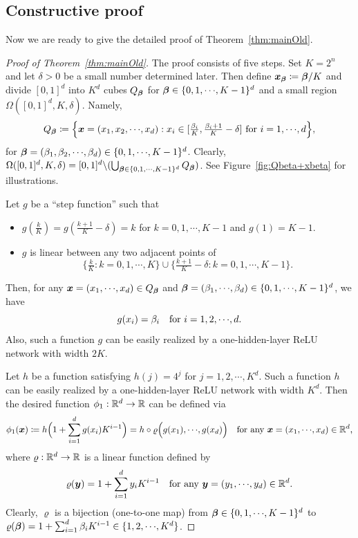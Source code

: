\documentclass[nohyperref]{article}
\theoremstyle{plain}
\theoremstyle{definition}
\theoremstyle{remark}
\begin{document}
\subsection{Constructive proof}\label{sec:proof:main:old}
Now we are ready to give the detailed proof of Theorem~\ref{thm:mainOld}.
\begin{proof}[Proof of Theorem~\ref{thm:mainOld}]
	The proof consists of five steps.
	Set $K=2^n $  and let $\delta>0$ be a small number determined later. Then define ${\bm{x}}_{\bm{\beta}}\coloneqq {\bm{\beta}}/K$ and divide $[0,1]^d$ into $K^d$  cubes $Q_{\bm{\beta}}$ for $\bmbeta\in\{0,1,\cdots,K-1\}^d$ and a small region $\Omega([0,1]^d,K,\delta)$. Namely,
	\begin{equation*}
		Q_\bmbeta\coloneqq \Big\{\bmx=(x_1,x_2,\cdots,x_d): x_i\in [\tfrac{\beta_i}{K},\tfrac{\beta_i+1}{K}-\delta]\ \tn{for}\ i=1,\cdots,d\Big\},
	\end{equation*}
	for $\bmbeta=(\beta_1,\beta_2,\cdots,\beta_d)\in \{0,1,\cdots,K-1\}^d$. 
	Clearly, $\Omega([0,1]^d,K,\delta)= [0,1]^d\backslash (\bigcup_{\bmbeta\in \{0,1,\cdots,K-1\}^d}Q_\bmbeta)$. See  Figure~\ref{fig:Qbeta+xbeta} for illustrations.
	
	Let $g$ be a ``step function'' such that
	\begin{itemize}
		\item $g(\tfrac{k}{K})=g(\frac{k+1}{K}-\delta)=k$ for $k=0,1,\cdots,K-1$ and $g(1)=K-1$.
		\item $g$ is linear between any two adjacent points of \[\{\tfrac{k}{K}:k=0,1,\cdots,K\}\cup \{\tfrac{k+1}{K}-\delta:k=0,1,\cdots,K-1\}.\]
	\end{itemize}
	Then, for any $\bmx=(x_1,\cdots,x_d)\in Q_\bmbeta$ and $\bmbeta=(\beta_1,\cdots,\beta_d)\in \{0,1,\cdots,K-1\}^d$, we have
	\[g(x_i)=\beta_i\quad \tn{for $i=1,2,\cdots,d$.} \]
	Also, such a function $g$ can be easily realized by a one-hidden-layer ReLU network with width $2K$.
	
	
	
	Let $h$ be a function satisfying $h(j)=4^j$ for $j=1,2,\cdots,K^d$. Such a function $h$ can be easily realized by a one-hidden-layer ReLU network with width $K^d$. Then the desired function  $\phi_1:\R^d\to\R$  can be defined via
	\begin{equation*}
		\phi_1(\bmx)\coloneqq h\Big(1+\sum_{i=1}^d g(x_i)K^{i-1}\Big)=h\circ\varrho\Big(g(x_1),\cdots,g(x_d)\Big)\quad \tn{for any $\bmx=(x_1,\cdots,x_d)\in \R^d$,}
	\end{equation*}
	where $\varrho:\R^d\to\R$ is a linear function defined by 
	\begin{equation*}
		\varrho(\bmy)=1+\sum_{i=1}^d y_i K^{i-1}\quad \tn{for any $\bmy=(y_1,\cdots,y_d)\in \R^d$.}
	\end{equation*}  
	Clearly, $\varrho$ is a bijection (one-to-one map) from $\bmbeta\in \{0,1,\cdots,K-1\}^d$ to $\varrho(\bmbeta)=1+\sum_{i=1}^d \beta_i K^{i-1}\in \{1,2,\cdots,K^d\}$.
	

\end{proof}
\end{document}
